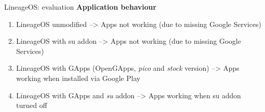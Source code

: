 \documentclass[
    11pt,%
    aspectratio=169,%
]{beamer}
\begin{document}

%





\begin{frame}{LineageOS: evaluation}
\textbf{Application behaviour}
\begin{enumerate}
\item LineageOS unmodified\newline
--> Apps not working (due to missing Google Services)\newline
\item LineageOS with su addon\newline
--> Apps not working (due to missing Google Services)\newline
\item LineageOS with GApps (OpenGApps, \emph{pico} and \emph{stock} version)\newline
--> Apps working when installed via Google Play\newline
\item LineageOS with GApps and \emph{su} addon\newline
--> Apps working when su addon turned off\newline

\end{enumerate}
\end{frame}
\end{document}
